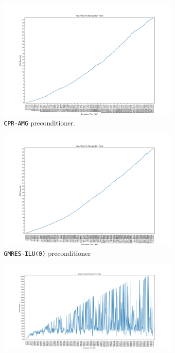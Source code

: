 \begin{figure}
\centering
\begin{subfigure}{.5\textwidth}
  \centering
  \includegraphics[width=1.1\linewidth]{figures/case2/cpr/cpu_time.png_reduced.png}
  \caption{\texttt{CPR-AMG} preconditioner.}
	\label{case2_cpu_cpr}
\end{subfigure}%
\begin{subfigure}{.5\textwidth}
  \centering
  \includegraphics[width=1.1\linewidth]{figures/case2/ilu/cpu_time.png_reduced.png}
  \caption{\texttt{GMRES-ILU(0)} preconditioner}
	\label{case2_cpu_ilu}
\end{subfigure}
\begin{subfigure}{.5\textwidth}
  \centering
  \includegraphics[width=1.1\linewidth]{figures/case2/cpr/its_time.png_reduced.png}

\end{subfigure}
\end{figure}
